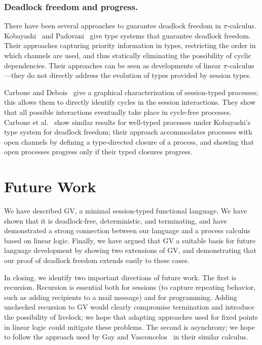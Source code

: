 \documentclass[oribibl,orivec,envcountsame]{llncs}
\begin{document}
\subsubsection{Deadlock freedom and progress.}

There have been several approaches to guarantee deadlock freedom in $\pi$-calculus.
Kobayashi~\cite{Kobayashi06} and Padovani~\cite{Padovani14} give type systems that guarantee
deadlock freedom.  Their approaches capturing priority information in types, restricting the order
in which channels are used, and thus statically eliminating the possibility of cyclic dependencies.
Their approaches can be seen as developments of linear $\pi$-calculus---they do not directly address
the evolution of types provided by session types.

Carbone and Debois~\cite{Carbone10} give a graphical characterization of session-typed processes;
this allows them to directly identify cycles in the session interactions.  They show that all
possible interactions eventually take place in cycle-free processes.  Carbone et
al.~\cite{CarboneDM14} show similar results for well-typed processes under Kobayashi's type system
for deadlock freedom; their approach accommodates processes with open channels by defining a
type-directed closure of a process, and showing that open processes progress only if their typed
closures progress.

\section{Future Work}\label{sec:conclusion}

We have described GV, a minimal session-typed functional language.  We have shown that it is
deadlock-free, deterministic, and terminating, and have demonstrated a strong connection between our
language and a process calculus based on linear logic.  Finally, we have argued that GV a suitable
basis for future language development by showing two extensions of GV, and demonstrating that our
proof of deadlock freedom extends easily to these cases.

In closing, we identify two important directions of future work.  The first is recursion.  Recursion
is essential both for sessions (to capture repeating behavior, such as adding recipients to a mail
message) and for programming.  Adding unchecked recursion to GV would clearly compromise termination
and introduce the possibility of livelock; we hope that adapting approaches used for fixed points in
linear logic could mitigate these problems.  The second is asynchrony; we hope to follow the
approach used by Gay and Vasconcelos~\cite{GayVasconcelos10} in their similar calculus.
\end{document}
